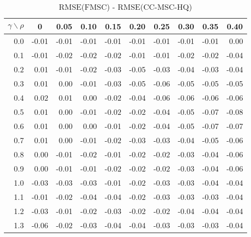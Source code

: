 \documentclass[12pt]{article}
\begin{document}
%
\begin{table}[!tbp]
\caption{RMSE(FMSC) - RMSE(CC-MSC-HQ)}
 \begin{center}
 \begin{tabular}{r|rrrrrrrrr}\hline\hline
\multicolumn{1}{c|}{$\gamma\backslash\rho$}&\multicolumn{1}{c}{0}&\multicolumn{1}{c}{0.05}&\multicolumn{1}{c}{0.10}&\multicolumn{1}{c}{0.15}&\multicolumn{1}{c}{0.20}&\multicolumn{1}{c}{0.25}&\multicolumn{1}{c}{0.30}&\multicolumn{1}{c}{0.35}&\multicolumn{1}{c}{0.40}\tabularnewline
\hline
0.0&-0.01&-0.01&-0.01&-0.01&-0.01&-0.01&-0.01&-0.01& 0.00\tabularnewline
0.1&-0.01&-0.02&-0.02&-0.02&-0.01&-0.01&-0.02&-0.02&-0.04\tabularnewline
0.2& 0.01&-0.01&-0.02&-0.03&-0.05&-0.03&-0.04&-0.03&-0.04\tabularnewline
0.3& 0.01& 0.00&-0.01&-0.03&-0.05&-0.06&-0.05&-0.05&-0.05\tabularnewline
0.4& 0.02& 0.01& 0.00&-0.02&-0.04&-0.06&-0.06&-0.06&-0.06\tabularnewline
0.5& 0.01& 0.00&-0.01&-0.02&-0.02&-0.04&-0.05&-0.07&-0.08\tabularnewline
0.6& 0.01& 0.00& 0.00&-0.01&-0.02&-0.04&-0.05&-0.07&-0.07\tabularnewline
0.7& 0.01& 0.00&-0.01&-0.02&-0.03&-0.03&-0.04&-0.05&-0.06\tabularnewline
0.8& 0.00&-0.01&-0.02&-0.01&-0.02&-0.02&-0.03&-0.04&-0.06\tabularnewline
0.9& 0.00&-0.01&-0.01&-0.02&-0.02&-0.02&-0.03&-0.04&-0.06\tabularnewline
1.0&-0.03&-0.03&-0.03&-0.01&-0.02&-0.03&-0.03&-0.04&-0.04\tabularnewline
1.1&-0.01&-0.02&-0.04&-0.04&-0.02&-0.03&-0.03&-0.03&-0.04\tabularnewline
1.2&-0.03&-0.01&-0.02&-0.03&-0.02&-0.02&-0.04&-0.04&-0.04\tabularnewline
1.3&-0.06&-0.02&-0.03&-0.04&-0.04&-0.03&-0.03&-0.03&-0.04\tabularnewline
\hline
\end{tabular}

\end{center}

\end{table}
\end{document}
